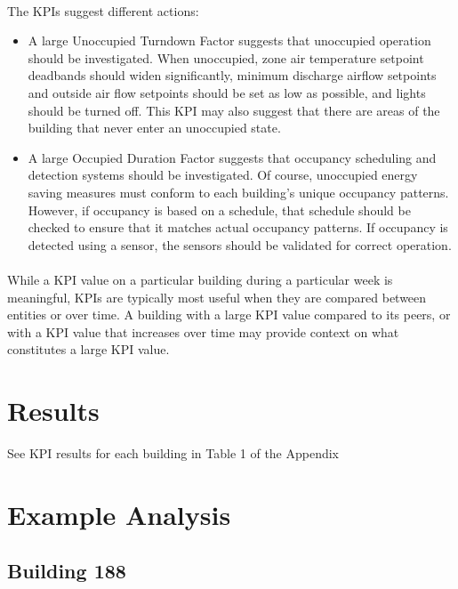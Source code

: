 \documentclass[a4paper]{article}
\begin{document}
\paragraph{}
The KPIs suggest different actions:
\begin{itemize}
\item{A large Unoccupied Turndown Factor suggests that unoccupied operation should be investigated. When unoccupied, zone air temperature setpoint deadbands should widen significantly, minimum discharge airflow setpoints and outside air flow setpoints should be set as low as possible, and lights should be turned off. This KPI may also suggest that there are areas of the building that never enter an unoccupied state.}
\item{A large Occupied Duration Factor suggests that occupancy scheduling and detection systems should be investigated. Of course, unoccupied energy saving measures must conform to each building's unique occupancy patterns. However, if occupancy is based on a schedule, that schedule should be checked to ensure that it matches actual occupancy patterns. If occupancy is detected using a sensor, the sensors should be validated for correct operation.}
\end{itemize}

\paragraph{}
While a KPI value on a particular building during a particular week is meaningful, KPIs are typically most useful when they are compared between entities or over time. A building with a large KPI value compared to its peers, or with a KPI value that increases over time may provide context on what constitutes a large KPI value.

\section{Results}

See KPI results for each building in Table 1 of the Appendix

\section{Example Analysis}

\subsection{Building 188}
\end{document}
